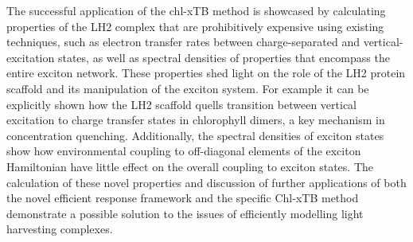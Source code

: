 \begin{SingleSpace}
The successful application of the chl-xTB method is showcased by calculating properties 
of the LH2 complex that are prohibitively expensive using existing techniques, such 
as electron transfer rates between charge-separated and vertical-excitation states,
as well as spectral densities of properties that encompass the entire exciton network. 
These properties shed light on the role of the LH2 protein scaffold and its manipulation
of the exciton system. For example it can be explicitly shown how the LH2 scaffold 
quells transition between vertical excitation to charge transfer states in chlorophyll 
dimers, a key mechanism in concentration quenching. Additionally, the spectral densities
of exciton states show how environmental coupling to off-diagonal elements of the
exciton Hamiltonian have little effect on the overall coupling to exciton states. 
The calculation of these novel properties and discussion of further applications 
of both the novel efficient response framework and the specific Chl-xTB method demonstrate
a possible solution to the issues of efficiently modelling light harvesting complexes.

\end{SingleSpace}
\clearpage